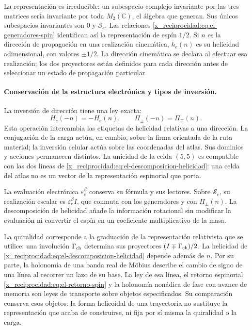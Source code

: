 La representación es irreducible: un subespacio complejo invariante por
las tres matrices sería invariante por toda \(M_2(\mathbb C)\), el
álgebra que generan. Sus únicos subespacios invariantes son \(0\) y
\(\mathscr S_e\). Las relaciones
\eqref{x_reciprocidad:eq:el-generadores-spin} identifican así la representación de
espín \(1/2\). Si \(n\) es la dirección de propagación en una
realización cinemática, \(h_e(n)\) es su helicidad adimensional, con
valores \(\pm1/2\). La dirección cinemática se declara al efectuar esa
realización; los dos proyectores están definidos para cada dirección
antes de seleccionar un estado de propagación particular.

\paragraph{Conservación de la estructura electrónica y tipos de inversión.}
La inversión de dirección tiene una ley exacta:
\[
 H_e(-n)=-H_e(n),\qquad \Pi_\pm(-n)=\Pi_\mp(n).
\]
Esta operación intercambia las etiquetas de helicidad relativas a una
dirección. La conjugación de la carga actúa, en cambio, sobre la firma
orientada de la ruta material; la inversión celular actúa sobre las
coordenadas del atlas. Sus dominios y acciones permanecen distintos.
La unicidad de la celda \((5,5)\) es compatible con las dos líneas de
\eqref{x_reciprocidad:eq:el-descomposicion-helicidad}: una celda del atlas no es un
vector de la representación espinorial que porta.

La evaluación electrónica \(\varepsilon_e^\beta\) conserva su
fórmula y sus lectores. Sobre \(\mathscr S_e\), su realización escalar
es \(\varepsilon_e^\beta I\), que conmuta con los generadores y con
\(\Pi_\pm(n)\). La descomposición de helicidad añade la información
rotacional sin modificar la evaluación ni convertir el espín en un
coeficiente multiplicativo de la masa.

La quiralidad corresponde a la graduación de la representación relativista
que se utilice: una involución \(\Gamma_{\rm ch}\) determina sus
proyectores \((I\mp\Gamma_{\rm ch})/2\). La helicidad de
\eqref{x_reciprocidad:eq:el-descomposicion-helicidad} depende además de \(n\).
Por su parte, la holonomía de una banda real de Möbius describe el cambio
de signo de una línea al recorrer un lazo de su base. La ley de esa línea,
el retorno espinorial \eqref{x_reciprocidad:eq:el-retorno-spin} y la holonomía nonádica
de fase con avance de memoria son leyes de transporte sobre objetos
especificados. Su comparación conserva esos objetos: la forma helicoidal
de una trayectoria no sustituye la representación que acaba de
construirse, ni fija por sí misma la quiralidad o la carga.

